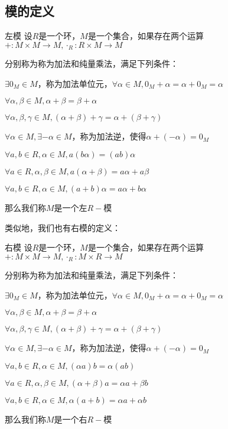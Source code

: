 \documentclass[12pt, a4paper, oneside, UTF8]{ctexbook}
\begin{document}
		\subsection{模的定义}
			\begin{defn}{左模}{}
				设$R$是一个环，$M$是一个集合，如果存在两个运算$+ : M \times M \rightarrow M,\cdot_R : R \times M \rightarrow M$
				
				分别称为称为加法和纯量乘法，满足下列条件：

				 $\exists 0_M \in M$，称为加法单位元，$\forall \alpha \in M,0_M + \alpha =\alpha +0_M=\alpha $

				 $\forall \alpha,\beta  \in M,\alpha +\beta =\beta +\alpha $

				 $\forall \alpha,\beta,\gamma  \in M,(\alpha +\beta )+\gamma =\alpha +(\beta +\gamma )$

				 $\forall \alpha \in M,\exists -\alpha \in M$，称为加法逆，使得$\alpha +(-\alpha )=0_M$

				 $\forall a,b \in R,\alpha \in M,a(b\alpha )=(ab)\alpha$

				 $\forall a \in R,\alpha ,\beta \in M,a(\alpha +\beta )=a\alpha +a\beta $

				 $\forall a,b \in R,\alpha \in M,(a+b)\alpha =a\alpha +b\alpha $

				那么我们称$M$是一个左$R-$模
			\end{defn}
			类似地，我们也有右模的定义：
			\begin{defn}{右模}{}
				设$R$是一个环，$M$是一个集合，如果存在两个运算$+ : M \times M \rightarrow M,\cdot_R : M \times R \rightarrow M$
				
				分别称为称为加法和纯量乘法，满足下列条件：

				 $\exists 0_M \in M$，称为加法单位元，$\forall \alpha \in M,0_M + \alpha =\alpha +0_M=\alpha $

				 $\forall \alpha,\beta  \in M,\alpha +\beta =\beta +\alpha $

				 $\forall \alpha,\beta,\gamma  \in M,(\alpha +\beta )+\gamma =\alpha +(\beta +\gamma )$

				 $\forall \alpha \in M,\exists -\alpha \in M$，称为加法逆，使得$\alpha +(-\alpha )=0_M$

				 $\forall a,b \in R,\alpha \in M,(\alpha a)b=\alpha (ab)$

				 $\forall a \in R,\alpha ,\beta \in M,(\alpha +\beta )a=\alpha a+\beta b$

				 $\forall a,b \in R,\alpha \in M,\alpha (a+b)=\alpha a+\alpha b$

				那么我们称$M$是一个右$R-$模
			\end{defn}
\end{document}
